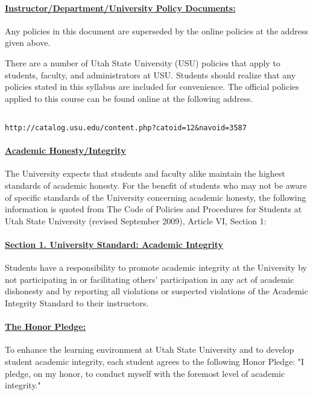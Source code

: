 \documentclass[10pt,fleqn]{article}
\begin{document}
\paragraph{\underline{Instructor/Department/University Policy Documents:}}
Any policies in this document are superseded by the online policies at the
address given above.

\noindent
There are a number of Utah State University (USU) policies that apply to
students, faculty, and administrators at USU. Students should realize that any
policies stated in this syllabus are included for convenience. The official
policies applied to this course can be found online at the following address.
\begin{verbatim}

http://catalog.usu.edu/content.php?catoid=12&navoid=3587

\end{verbatim}

\paragraph{\underline{Academic Honesty/Integrity}} The University expects that
students and faculty alike maintain the highest standards of academic honesty.
For the benefit of students who may not be aware of specific standards of the
University concerning academic honesty, the following information is quoted from
The Code of Policies and Procedures for Students at Utah State University
(revised September 2009), Article VI, Section 1:

\paragraph{\underline{Section 1. University Standard: Academic Integrity}}
Students have a responsibility to promote academic integrity at the University
by not participating in or facilitating others' participation in any act of
academic dishonesty and by reporting all violations or suspected violations of
the Academic Integrity Standard to their instructors.

\paragraph{\underline{The Honor Pledge:}} To enhance the learning environment at
Utah State University and to develop student academic integrity, each student
agrees to the following Honor Pledge: "I pledge, on my honor, to conduct myself
with the foremost level of academic integrity."
\end{document}
